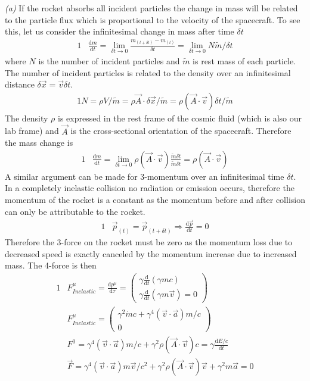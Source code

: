 \documentclass[]{article}
\numberwithin{equation}{subsection}
\begin{document}
\noindent \emph{(a)} If the rocket absorbs all incident particles the change in mass will be related to the particle flux which is proportional to the velocity of the spacecraft. To see this, let us consider the infinitesimal change in mass after time $\delta t$
\begin{alignat}{1}
	\label{e25}	&\frac{\mathrm{d}m}{\mathrm{d}t}=\lim_{\delta t\to 0}\frac{m_{(t+\delta t)}-m_{(t)}}{\delta t}=\lim_{\delta t\to 0}N\tilde{m}/\delta t
\end{alignat}
where $N$ is the number of incident particles and $\tilde{m}$ is rest mass of each particle. The number of incident particles is related to the density over an infinitesimal distance $\delta \vec{x}=\vec{v}\delta t$.  
\begin{alignat}{1}
	\label{e26} N=\rho V/\tilde{m}=\rho \vec{A}\cdot\delta\vec{x}/\tilde{m}=\rho (\vec{A}\cdot\vec{v})\delta t/\tilde{m}
\end{alignat}
The density $\rho$ is expressed in the rest frame of the cosmic fluid (which is also our lab frame) and $\vec{A}$ is the cross-sectional orientation of the spacecraft. Therefore the mass change is  
\begin{alignat}{1}
	\label{e27}	&\frac{\mathrm{d}m}{\mathrm{d}t}=\lim_{\delta t\to 0}\rho(\vec{A}\cdot\vec{v})\frac{\tilde{m}\delta t}{\tilde{m}\delta t}=\rho(\vec{A}\cdot\vec{v})
\end{alignat}
A similar argument can be made for 3-momentum over an infinitesimal time $\delta t$. In a completely inelastic collision no radiation or emission occurs, therefore the momentum of the rocket is a constant as the momentum before and after collision can only be attributable to the rocket.
\begin{alignat}{1}
	\label{e28}	&\vec{p}_{(t)}=\vec{p}_{(t+\delta t)}\Longrightarrow\frac{\mathrm{d}\vec{p}}{\mathrm{d}t}=0
\end{alignat}
Therefore the 3-force on the rocket must be zero as the momentum loss due to decreased speed is exactly canceled by the momentum increase due to increased mass. The 4-force is then
\begin{alignat}{1}
	\label{e29}	&F^{\mu}_{Inelastic}=\frac{\mathrm{d}p^{\mu}}{\mathrm{d}\tau}=
	\begin{pmatrix}
		\gamma\frac{\mathrm{d}}{\mathrm{d}t}(\gamma m c)\\
		\gamma\frac{\mathrm{d}}{\mathrm{d}t}(\gamma m\vec{v})=0
	\end{pmatrix}\\
	\label{e30}	&F^{\mu}_{Inelastic}=
	\begin{pmatrix}
		\gamma^{2}\dot{m}c+\gamma^{4}(\vec{v}\cdot\vec{a})m/c\\
		0
	\end{pmatrix}\\
	\label{e31}	&F^{0}=\gamma^{4}(\vec{v}\cdot\vec{a})m/c+\gamma^{2}\rho(\vec{A}\cdot\vec{v})c=\gamma\frac{\mathrm{d}E/c}{\mathrm{d}t}\\
	\label{e32}	&\vec{F}=\gamma^{4}(\vec{v}\cdot\vec{a})m\vec{v}/c^{2}+\gamma^{2}\rho(\vec{A}\cdot\vec{v})\vec{v}+\gamma^{2}m\vec{a}=0
\end{alignat}
\end{document}
